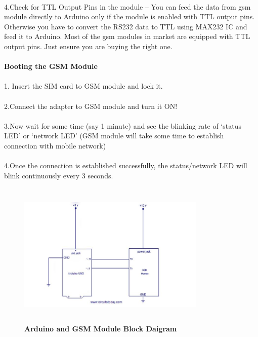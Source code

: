 \paragraph{}4.Check for TTL Output Pins in the module – You can feed the data from gsm module directly to Arduino only if the module is enabled with TTL output pins. Otherwise you have to convert the RS232 data to TTL using MAX232 IC and feed it to Arduino. Most of the gsm modules in market are equipped with TTL output pins. Just ensure you are buying the right one.
\paragraph{}
\textbf{Booting the GSM Module}
\paragraph{}1. Insert the SIM card to GSM module and lock it.

\paragraph{}2.Connect the adapter to GSM module and turn it ON!

\paragraph{}3.Now wait for some time (say 1 minute) and see the blinking rate of ‘status LED’  or ‘network LED’ (GSM module will take some time to establish connection with mobile network)

\paragraph{}4.Once the connection is established successfully, the status/network LED will blink continuously every 3 seconds.
\begin{figure}[H]
 \centering
    \includegraphics[height= 7cm, width=9cm]{project/images/cir}
  \caption{\textbf{Arduino and GSM Module Block Daigram}}
\end{figure}
